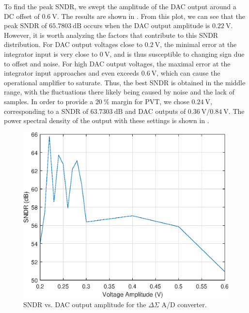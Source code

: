 \documentclass[journal,hidelinks]{IEEEtran}
\begin{document}
To find the peak SNDR, we swept the amplitude of the DAC output around a DC offset of $\SI{0.6}{\volt}$. The results are shown in . From this plot, we can see that the peak SNDR of $\SI{65.7803}{\deci\bel}$ occurs when the DAC output amplitude is $\SI{0.22}{\volt}$. However, it is worth analyzing the factors that contribute to this SNDR distribution. For DAC output voltages close to $\SI{0.2}{\volt}$, the minimal error at the integrator input is very close to $\SI{0}{\volt}$, and is thus susceptible to changing sign due to offset and noise. For high DAC output voltages, the maximal error at the integrator input approaches and even exceeds $\SI{0.6}{\volt}$, which can cause the operational amplifier to saturate. Thus, the best SNDR is obtained in the middle range, with the fluctuations there likely being caused by noise and the lack of samples. In order to provide a $\SI{20}{\percent}$ margin for PVT, we chose $\SI{0.24}{\volt}$, corresponding to a SNDR of $\SI{63.7303}{\deci\bel}$ and DAC outputs of $\SI{0.36}{\volt}/\SI{0.84}{\volt}$. The power spectral density of the output with these settings is shown in .

\begin{figure}[!htb]
  \centering
  \includegraphics[width=0.8\columnwidth]{simulation/sndr_vs_dac.eps}
  \caption{SNDR vs. DAC output amplitude for the $\Delta \Sigma$ A/D converter.}
  \label{fig:sim_sndr_vs_dac}
\end{figure}
\end{document}
